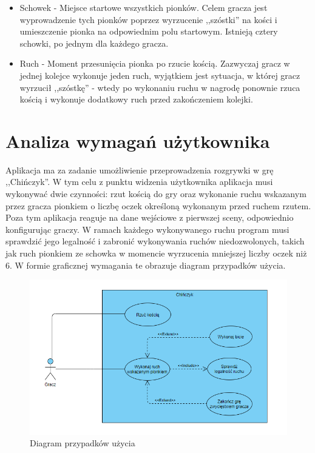 \documentclass[conference]{IEEEtran}
\begin{document}
\begin{itemize}
    \item Schowek - Miejsce startowe wszystkich pionków. Celem gracza jest wyprowadzenie tych pionków poprzez wyrzucenie ,,szóstki'' na kości i umieszczenie pionka na odpowiednim polu startowym. Istnieją cztery schowki, po jednym dla każdego gracza.
    \item Ruch - Moment przesunięcia pionka po rzucie kością. Zazwyczaj gracz w jednej kolejce wykonuje jeden ruch, wyjątkiem jest sytuacja, w której gracz wyrzucił ,,szóstkę'' - wtedy po wykonaniu ruchu w nagrodę ponownie rzuca kością i wykonuje dodatkowy ruch przed zakończeniem kolejki.
\end{itemize}


\section{Analiza wymagań użytkownika}
Aplikacja ma za zadanie umożliwienie przeprowadzenia rozgrywki w grę ,,Chińczyk''. W tym celu z punktu widzenia użytkownika aplikacja musi wykonywać dwie czynności: rzut kością do gry oraz wykonanie ruchu wskazanym przez gracza pionkiem o liczbę oczek określoną wykonanym przed ruchem rzutem. Poza tym aplikacja reaguje na dane wejściowe z pierwszej sceny, odpowiednio konfigurując graczy. W ramach każdego wykonywanego ruchu program musi sprawdzić jego legalność i zabronić wykonywania ruchów niedozwolonych, takich jak ruch pionkiem ze schowka w momencie wyrzucenia mniejszej liczby oczek niż 6. W formie graficznej wymagania te obrazuje diagram przypadków użycia.

\begin{figure}[H]
    \centering
    \includegraphics[width=\linewidth]{UseCase.png}
    \caption{Diagram przypadków użycia}
\end{figure}
\end{document}
